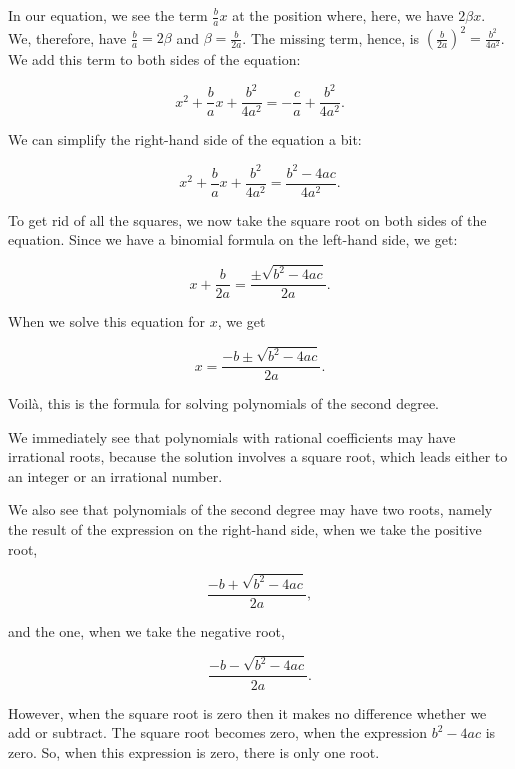 \documentclass[tikz]{scrreprt}
\begin{document}
In our equation, we see the term $\frac{b}{a}x$ at the position
where, here, we have $2\beta x$.
We, therefore, have $\frac{b}{a} = 2\beta$ 
and $\beta = \frac{b}{2a}$.
The missing term, hence, is 
$\left(\frac{b}{2a}\right)^2 = \frac{b^2}{4a^2}$.
We add this term to both sides of the equation:

\begin{equation}
x^2 + \frac{b}{a}x + \frac{b^2}{4a^2} = -\frac{c}{a} + \frac{b^2}{4a^2}.
\end{equation}

We can simplify the right-hand side of the equation a bit:

\begin{equation}
x^2 + \frac{b}{a}x + \frac{b^2}{4a^2} = \frac{b^2-4ac}{4a^2}.
\end{equation}

To get rid of all the squares, we now take the square root
on both sides of the equation. Since we have a binomial
formula on the left-hand side, we get:

\begin{equation}
x + \frac{b}{2a} = \frac{\pm\sqrt{b^2-4ac}}{2a}.
\end{equation}

When we solve this equation for $x$, we get

\begin{equation}
x = \frac{-b \pm\sqrt{b^2-4ac}}{2a}.
\end{equation}

Voilà, this is the formula for solving polynomials of
the second degree.

We immediately see that polynomials with rational coefficients
may have irrational roots, because the solution involves
a square root, which leads either to an integer or
an irrational number.

We also see that polynomials of the second degree
may have two roots, namely the result of the expression
on the right-hand side, when we take the positive root,
\ie\ 

\[
\frac{-b+\sqrt{b^2-4ac}}{2a},
\]

and the one, when we take the negative root, \ie

\[
\frac{-b-\sqrt{b^2-4ac}}{2a}.
\]

However, when the square root is zero
then it makes no difference whether we add
or subtract. The square root becomes zero, when
the expression
$b^2-4ac$ is zero. So, when this expression
is zero, there is only one root.
\end{document}
